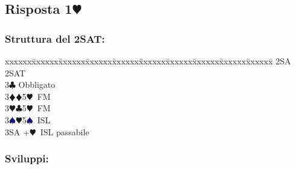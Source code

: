 \documentclass[a4paper,italian]{article}
\newcommand{\BC}{\textcolor{OliveGreen}{$\clubsuit$}}
\newcommand{\BD}{\textcolor{RedOrange}{$\vardiamondsuit$}}
\newcommand{\BH}{\textcolor{Red2}{$\varheartsuit${}}}
\newcommand{\BS}{\textcolor{MidnightBlue}{$\spadesuit${}}}
\newcommand{\pdfh}{\texorpdfstring{\BH{}}{H}}
\newenvironment{bidtable}
{\begin{tabbing}

    xxxxxx\=xxxxxx\=xxxxxx\=xxxxxx\=xxxxxx\=xxxxxx\=xxxxxx\=xxxxxx\=xxxxxx\=xxxxxx\=\kill}
{\end{tabbing} }%
\begin{document}
\begin{multicols}{2}
                                    \subsection{Risposta 1\pdfh}

                                    \subsubsection{Struttura del 2SAT:}
                                    \begin{bidtable}
                                        2SA \> 2SAT\+\\
                                        3\BC \> Obbligato\+\\
                                        3\BD {}\BD 5\BH\ FM\\
                                        3\BH {}\BC 5\BH\ FM\\
                                        3\BS {}\BH 5\BS\ ISL\\
                                        3SA +\BH\ ISL passabile\-\-
                                    \end{bidtable}
                                    \subsubsection{Sviluppi:}


\end{multicols}
\end{document}
